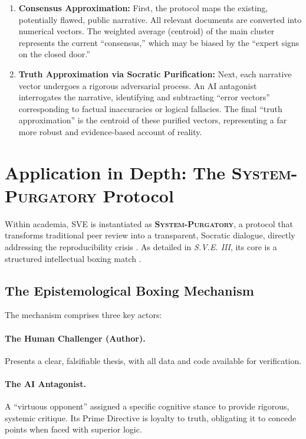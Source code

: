 \documentclass[11pt,a4paper]{article}
\theoremstyle{definition}
\begin{document}
\begin{enumerate}[itemsep=0.3em]
    \item \textbf{Consensus Approximation:} First, the protocol maps the existing, potentially flawed, public narrative. All relevant documents are converted into numerical vectors. The weighted average (centroid) of the main cluster represents the current ``consensus,'' which may be biased by the ``expert signs on the closed door.''
    
    \item \textbf{Truth Approximation via Socratic Purification:} Next, each narrative vector undergoes a rigorous adversarial process. An AI antagonist interrogates the narrative, identifying and subtracting ``error vectors'' corresponding to factual inaccuracies or logical fallacies. The final ``truth approximation'' is the centroid of these purified vectors, representing a far more robust and evidence-based account of reality.
\end{enumerate}

\section{Application in Depth: The \textsc{System-Purgatory} Protocol}

Within academia, SVE is instantiated as \textbf{\textsc{System-Purgatory}}, a protocol that transforms traditional peer review into a transparent, Socratic dialogue, directly addressing the reproducibility crisis \citep{Ioannidis2005}. As detailed in \emph{S.V.E. III}, its core is a structured intellectual boxing match \citep{Kovnatsky2025SVE3}.

\subsection{The Epistemological Boxing Mechanism}

The mechanism comprises three key actors:

\paragraph{The Human Challenger (Author).} Presents a clear, falsifiable thesis, with all data and code available for verification.

\paragraph{The AI Antagonist.} A ``virtuous opponent'' assigned a specific cognitive stance to provide rigorous, systemic critique. Its Prime Directive is loyalty to truth, obligating it to concede points when faced with superior logic.
\end{document}
